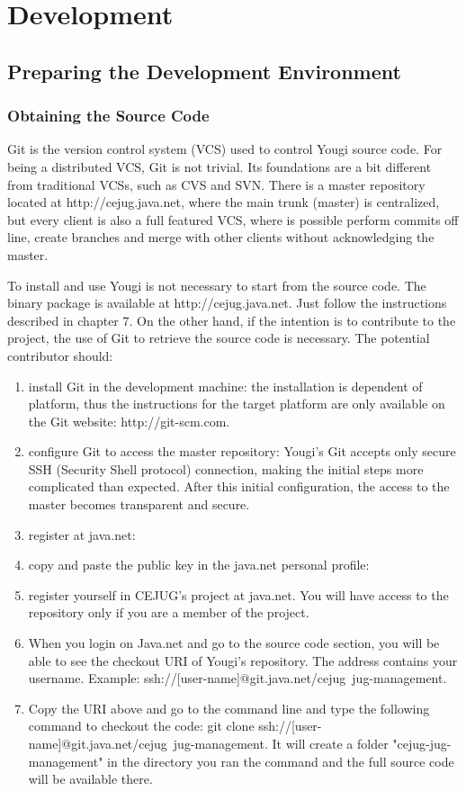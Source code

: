 \documentclass[envcountsame,envcountchap]{svmono}
\begin{document}
\chapter{Development}

\section{Preparing the Development Environment}

\subsection{Obtaining the Source Code}
\label{ssec:obtaining-source-code}

Git is the version control system (VCS) used to control Yougi source code. For being a distributed VCS, Git is not trivial. Its foundations are a bit different from traditional VCSs, such as CVS and SVN. There is a master repository located at http://cejug.java.net, where the main trunk (master) is centralized, but every client is also a full featured VCS, where is possible perform commits off line, create branches and merge with other clients without acknowledging the master.

To install and use Yougi is not necessary to start from the source code. The binary package is available at http://cejug.java.net. Just follow the instructions described in chapter 7. On the other hand, if the intention is to contribute to the project, the use of Git to retrieve the source code is necessary. The potential contributor should:

\begin{enumerate}
\item install Git in the development machine: the installation is dependent of platform, thus the instructions for the target platform are only available on the Git website: http://git-scm.com.
\item configure Git to access the master repository: Yougi's Git accepts only secure SSH (Security Shell protocol) connection, making the initial steps more complicated than expected. After this initial configuration, the access to the master becomes transparent and secure.
\item register at java.net:
\item copy and paste the public key in the java.net personal profile:
\item register yourself in CEJUG's project at java.net. You will have access to the repository only if you are a member of the project.
\item When you login on Java.net and go to the source code section, you will be able to see the checkout URI of Yougi's repository. The address contains your username. Example: ssh://[user-name]@git.java.net/cejug~jug-management.
\item Copy the URI above and go to the command line and type the following command to checkout the code: git clone ssh://[user-name]@git.java.net/cejug~jug-management. It will create a folder "cejug-jug-management" in the directory you ran the command and the full source code will be available there.
\end{enumerate}
\end{document}
